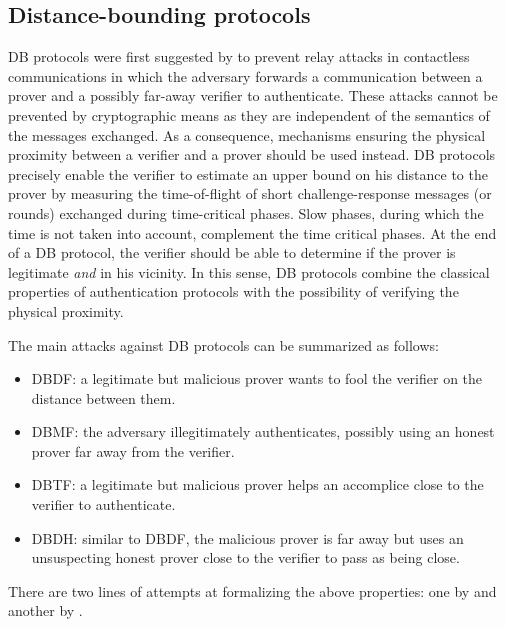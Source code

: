 \subsection{Distance-bounding protocols}%
\label{distance-bounding}

\Ac{DB} protocols were first suggested by \citet{DistanceBounding} to prevent relay attacks in contactless communications in which the adversary forwards a communication between a prover and a possibly far-away verifier to authenticate. 
These attacks cannot be prevented by cryptographic means as they are independent of the semantics of the messages exchanged.
As a consequence, mechanisms ensuring the physical proximity between a verifier and a prover should be used instead.
\Ac{DB} protocols precisely enable the verifier to estimate an upper bound on his distance to the prover by measuring the time-of-flight of short challenge-response messages (or rounds) exchanged during time-critical phases. 
Slow phases, during which the time is not taken into account, complement the time critical phases.
At the end of a \Ac{DB} protocol, the verifier should be able to determine if the prover is legitimate \emph{and} in his vicinity.
In this sense, \Ac{DB} protocols combine the classical properties of authentication protocols with the possibility of verifying the physical proximity.

The main attacks against \ac{DB} protocols can be summarized as follows:
\begin{itemize}
  \item \Acf{DBDF}: a legitimate but malicious prover wants to fool the verifier on the distance between them.
  \item \Acf{DBMF}: the adversary illegitimately authenticates, possibly using an honest prover far away from the verifier.
  \item \Acf{DBTF}: a legitimate but malicious prover helps an accomplice close to the verifier to authenticate.
  \item \Acf{DBDH}: similar to \ac{DBDF}, the malicious prover is far away but uses an unsuspecting honest prover close to the verifier to pass as being close.
\end{itemize}
There are two lines of attempts at formalizing the above properties: one by \citet{DB-BMV} and another by \citet{DB-DFKO}.

